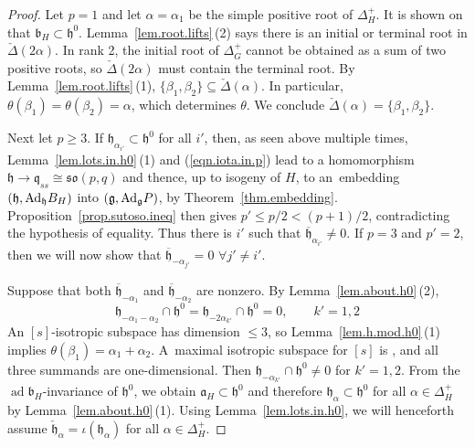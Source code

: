 \documentclass[10pt,a4paper]{amsart}
\numberwithin{equation}{section}
\theoremstyle{definition}
\newcommand{\lieh}{\mathfrak{h}}
\def\g{{\mathfrak g}}
\def\h{{\mathfrak h}}
\def\q{{\mathfrak q}}
\def\a{{\mathfrak a}}
\def\b{{\mathfrak b}}
\newcommand{\so}{\mathfrak{so}}
\newcommand{\ad}{\operatorname{ad}}
\begin{document}
\begin{proof}
Let $p=1$ and let $\alpha = \alpha_1$ be the simple positive root of $\Delta_H^+$. It is shown on \cite[p.~9]{pecastaing.rank1} that $\b_H \subset \lieh^0$.
Lemma~\ref{lem.root.lifts}\,(2) says
there is an initial or terminal root in $\check{\Delta}(2 \alpha)$. In rank 2, the initial root of $\Delta_G^+$ cannot be obtained as a sum of two positive roots, so $\check{\Delta}(2 \alpha)$ must contain the terminal root. By Lemma~\ref{lem.root.lifts}\,(1), $\{ \beta_1, \beta_2 \} \subseteq \check{\Delta}(\alpha)$. In particular, $\theta(\beta_1) = \theta(\beta_2) = \alpha$, which determines $\theta$. We conclude $\check{\Delta}(\alpha) = \{ \beta_1, \beta_2 \}$.

Next let $p \geq 3$.
If $\lieh_{\alpha_{i'}} \subset \h^0$ for all $i'$, then, as seen above multiple times, Lemma~\ref{lem.lots.in.h0}\,(1) and (\ref{eqn.iota.in.p}) lead to a homomorphism $\h \rightarrow \q_{ss} \cong \so(p,q)$ and thence, up to isogeny of $H$, to an~embedding $(\h, {\rm Ad}_\h B_H)$ into $(\g, {\rm Ad}_\g P)$, by Theorem~\ref{thm.embedding}. Proposition~\ref{prop.sutoso.ineq} then gives ${p' \leq p/2 < (p+1)/2}$, contradicting the hypothesis of equality. Thus there is $i'$ such that $\overline{\lieh}_{\alpha_{i'}} \neq 0$.
If $p=3$ and $p' = 2$, then we will now show that $\overline{\lieh}_{ - \alpha_{j'}} = 0$ $\forall j' \neq i'$.

Suppose that both $\overline{\lieh}_{- \alpha_1}$ and $\overline{\lieh}_{- \alpha_2}$ are nonzero. By Lemma~\ref{lem.about.h0}\,(2),
\[ \lieh_{- \alpha_1 - \alpha_2} \cap \lieh^0 = \lieh_{- 2 \alpha_{k'}} \cap \lieh^0 = 0 , \qquad k'=1,2\]
An $[s]$-isotropic subspace has dimension $\leq 3$, so Lemma~\ref{lem.h.mod.h0}\,(1) implies $\theta(\beta_1) = \alpha_{1} + \alpha_{2}$. A~maximal isotropic subspace for $[s]$ is \smash{$\overline{\lieh}_{- 2 \alpha_1} + \overline{\lieh}_{- \alpha_1} + \overline{\lieh}_{ - \alpha_2}$}, and all three summands are one-dimensional. Then $\lieh_{- \alpha_{k'}} \cap \lieh^0 \neq 0$ for $k'=1,2$. From the $\ad \b_H$-invariance of $\lieh^0$, we obtain $\a_H \subset \lieh^0$ and therefore $\lieh_{\alpha} \subset \lieh^0$ for all $\alpha \in \Delta_H^+$ by Lemma~\ref{lem.about.h0}\,(1). Using Lemma~\ref{lem.lots.in.h0}, we will henceforth assume $\check{\lieh}_{\alpha} = \iota(\lieh_\alpha)$ for all $\alpha \in \Delta_H^+$.


\end{proof}
\end{document}
